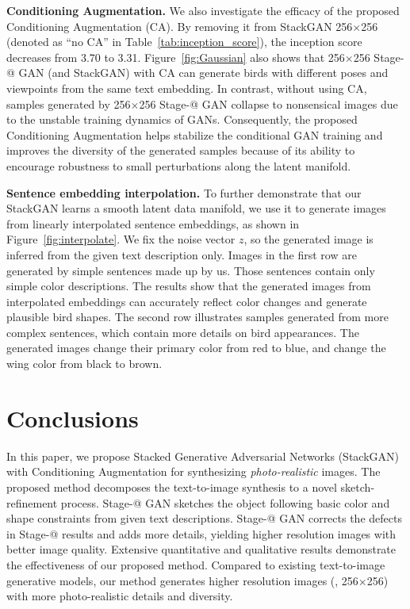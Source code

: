 \documentclass[10pt,twocolumn,letterpaper]{article}
\makeatletter
\newcommand{\Rmnum}[1]{\expandafter\@slowromancap\romannumeral #1@}
\makeatother
\begin{document}
\textbf{Conditioning Augmentation.} 
We also investigate the efficacy of the proposed Conditioning Augmentation (CA). By removing it from StackGAN 256$\times$256 (denoted as ``no CA'' in Table~\ref{tab:inception_score}), the inception score decreases from 3.70 to 3.31. Figure~\ref{fig:Gaussian} also shows that 256$\times$256 Stage-\Rmnum{1} GAN (and StackGAN) with CA can generate birds with different poses and viewpoints from the same text embedding. In contrast, without using CA, samples generated by 256$\times$256 Stage-\Rmnum{1} GAN collapse to nonsensical images due to the unstable training dynamics of GANs. Consequently, the proposed Conditioning Augmentation helps stabilize the conditional GAN training and improves the diversity of the generated samples because of its ability to encourage robustness to small perturbations along the latent manifold. 



\textbf{Sentence embedding interpolation. }
To further demonstrate that our StackGAN learns a smooth latent data manifold, we use it to generate images from linearly interpolated sentence embeddings, as shown in Figure~\ref{fig:interpolate}. We fix the noise vector $z$, so the generated image is inferred from the given text description only. Images in the first row are generated by simple sentences made up by us. Those sentences contain only simple color descriptions. The results show that the generated images from interpolated embeddings can accurately reflect color changes and generate plausible bird shapes. The second row illustrates samples generated from more complex sentences, which contain more details on bird appearances. The generated images change their primary color from red to blue, and change the wing color from black to brown.


\vspace{-5pt}
\section{Conclusions}
\vspace{-5pt}

In this paper, we propose Stacked Generative Adversarial Networks (StackGAN) with Conditioning Augmentation for synthesizing \emph{photo-realistic} images. The proposed method decomposes the text-to-image synthesis to a novel sketch-refinement process. Stage-\Rmnum{1} GAN sketches the object following basic color and shape constraints from given text descriptions. Stage-\Rmnum{2} GAN corrects the defects in Stage-\Rmnum{1} results and adds more details, yielding higher resolution images with better image quality. Extensive quantitative and qualitative results demonstrate the effectiveness of our proposed method. Compared to existing text-to-image generative models, our method generates higher resolution images (\eg, 256$\times$256) with more photo-realistic details and diversity. 
\end{document}
